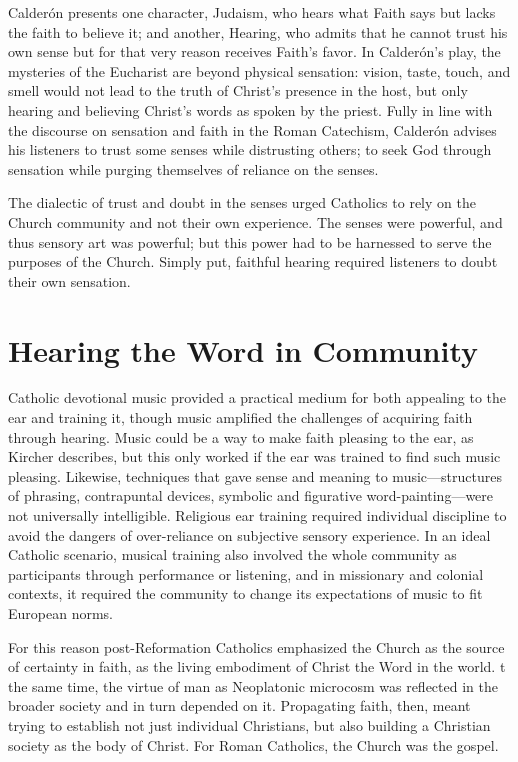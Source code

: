 
Calderón presents one character, Judaism, who hears what Faith says but lacks 
the faith to believe it; and another, Hearing, who admits that he cannot trust 
his own sense but for that very reason receives Faith's favor.
In Calderón's play, the mysteries of the Eucharist are beyond physical 
sensation: vision, taste, touch, and smell would not lead to the truth of 
Christ's presence in the host, but only hearing and believing Christ's words 
 as spoken by the priest.
Fully in line with the discourse on sensation and faith in the Roman Catechism, 
Calderón advises his listeners to trust some senses while distrusting others; 
to seek God through sensation while purging themselves of reliance on the 
senses.

The dialectic of trust and doubt in the senses urged Catholics to rely on the 
Church community and not their own experience.
The senses were powerful, and thus sensory art was powerful; but this power had 
to be harnessed to serve the purposes of the Church.
Simply put, faithful hearing required listeners to doubt their own sensation.

\section{Hearing the Word in Community}

Catholic devotional music provided a practical medium for both appealing to the 
ear and training it, though music amplified the challenges of acquiring faith 
through hearing.
Music could be a way to make faith pleasing to the ear, as Kircher  describes, 
but this only worked if the ear was trained to find such music pleasing.
Likewise, techniques that gave sense and meaning to music---structures of 
phrasing, contrapuntal devices, symbolic and figurative word-painting---were 
not universally intelligible.
Religious ear training required individual discipline to avoid the dangers of 
over-reliance on subjective sensory experience.
In an ideal Catholic scenario, musical training also involved the whole 
community as participants through performance or listening, and in missionary 
and colonial contexts, it required the community to change its expectations of 
music to fit European norms.

For this reason post-Reformation Catholics emphasized the Church as the source 
of certainty in faith, as the living embodiment of Christ the Word in the world.
t the same time, the virtue of man as Neoplatonic microcosm was reflected in 
the broader society and in turn depended on it.
Propagating faith, then, meant trying to establish not just individual 
Christians, but also building a Christian society as the body of Christ.
For Roman Catholics, the Church was the gospel.

